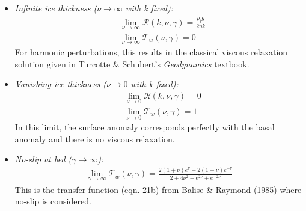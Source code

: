 \documentclass[paper=a4, fontsize=11pt]{article}
\begin{document}
\begin{itemize}
\item \emph{Infinite ice thickness (${\nu}\to\infty$ with k fixed):}
\begin{align}
&\lim_{\nu\to\infty} \mathcal{R}({k},\nu,{\gamma}) = \frac{\rho_i g }{2\eta {k}} \\
&\lim_{\nu\to\infty} \mathcal{T}_w(\nu,{\gamma}) =0
\end{align}
For harmonic perturbations, this results in the classical viscous
relaxation solution given in Turcotte \& Schubert's \emph{Geodynamics} textbook.
\item \emph{Vanishing ice thickness (${\nu}\to 0$ with k fixed):}
\begin{align}
&\lim_{\nu\to 0} \mathcal{R}({k},\nu,{\gamma}) = 0  \\
&\lim_{\nu\to 0} \mathcal{T}_w(\nu,{\gamma}) = 1
\end{align}
In this limit, the surface anomaly corresponds perfectly with the basal anomaly
and there is no viscous relaxation.
\item \emph{No-slip at bed (${\gamma}\to \infty$):}
\begin{align}
\lim_{\gamma\to\infty} \mathcal{T}_w({\nu},{\gamma}) = \frac{2(1+\nu) e^{\nu} + 2 (1-\nu) e^{-\nu} }{ 2+4\nu^2  + e^{2\nu} +e^{-2\nu}}
\end{align}
This is the transfer function (eqn. 21b) from Balise \& Raymond (1985) where no-slip is considered.
\end{itemize}
\end{document}
